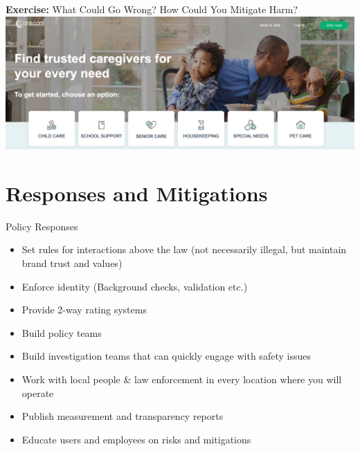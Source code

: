\documentclass[nobackground,dvipsnames,table,aspectratio=169]{beamer}
\begin{document}
\begin{frame}{\textbf{Exercise:} What Could Go Wrong? How Could You Mitigate Harm?}
    \includegraphics[width=\textwidth]{care-com}
\end{frame}

\section{Responses and Mitigations}

\begin{frame}{Policy Responses}
    \large
    \begin{itemize}
        \item Set rules for interactions above the law (not necessarily illegal, but maintain brand trust and values)
        \item Enforce identity (Background checks, validation etc.)
        \item Provide 2-way rating systems
        \item Build policy teams
        \item Build investigation teams that can quickly engage with safety issues
        \item Work with local people \& law enforcement in every location where you will operate
        \item Publish measurement and transparency reports
        \item Educate users and employees on risks and mitigations
    \end{itemize}
\end{frame}
\end{document}
